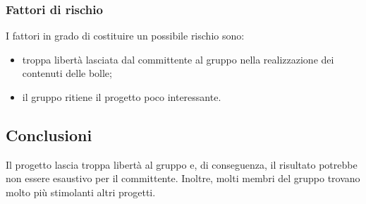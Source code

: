 		\subsubsection {Fattori di rischio}
		I fattori in grado di costituire un possibile rischio sono:
			\begin{itemize}
				\item troppa libertà lasciata dal committente al gruppo nella realizzazione dei contenuti delle bolle;		
				\item il gruppo ritiene il progetto poco interessante.
			\end{itemize}
	\subsection {Conclusioni}
		Il progetto lascia troppa libertà al gruppo e, di conseguenza, il risultato potrebbe non essere esaustivo per il committente. Inoltre, molti membri del gruppo trovano molto più stimolanti altri progetti.
	
